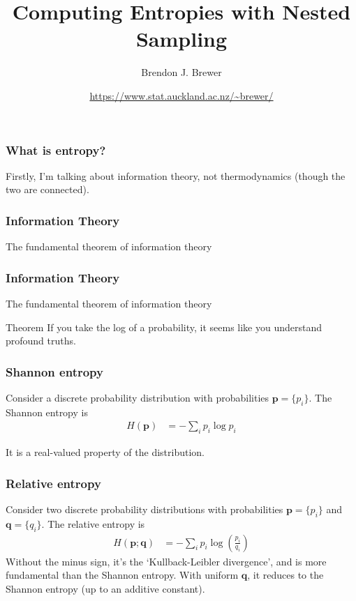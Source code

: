\documentclass{beamer}
\title{Computing Entropies with Nested Sampling}
\author{Brendon J. Brewer}
\institute{Department of Statistics\\
The University of Auckland}
\date{\color{blue}\url{https://www.stat.auckland.ac.nz/~brewer/}}
\begin{document}
\frame{\titlepage}


\begin{frame}
\frametitle{What is entropy?}

Firstly, I'm talking about information theory, not thermodynamics (though the
two are connected).

\end{frame}

\begin{frame}
\frametitle{Information Theory}

The fundamental theorem of information theory

\end{frame}


\begin{frame}
\frametitle{Information Theory}

The fundamental theorem of information theory
\begin{block}{Theorem}
If you take the log of a probability, it seems like you understand profound
truths.
\end{block}


\end{frame}


\begin{frame}
\frametitle{Shannon entropy}

Consider a discrete probability distribution with probabilities
$\boldsymbol{p} = \{p_i\}$. The Shannon entropy is
\begin{align}
H(\boldsymbol{p}) &= -\sum_i p_i \log p_i
\end{align}

It is a real-valued property of the distribution.

\end{frame}



\begin{frame}
\frametitle{Relative entropy}

Consider two discrete probability distributions with probabilities
$\boldsymbol{p} = \{p_i\}$ and $\boldsymbol{q} = \{q_i\}$.
The relative entropy is
\begin{align}
H(\boldsymbol{p}; \boldsymbol{q}) &= -\sum_i p_i \log\left(\frac{p_i}{q_i}\right)
\end{align}
Without the minus sign,
it's the `Kullback-Leibler divergence', and is more fundamental than the
Shannon entropy. With uniform $\boldsymbol{q}$, it reduces to the Shannon
entropy (up to an additive constant).
\end{frame}
\end{document}

